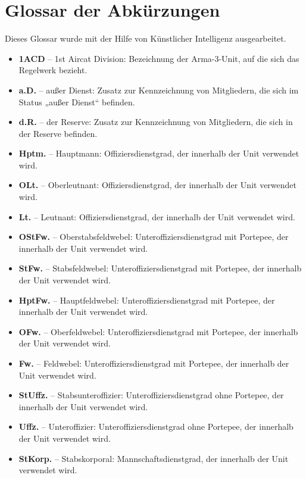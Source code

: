 \newpage
{}
\setcounter{page}{1}
\section{Glossar der Abkürzungen}

Dieses Glossar wurde mit der Hilfe von Künstlicher Intelligenz ausgearbeitet.

\begin{itemize}
    \item \textbf{1ACD} -- 1st Aircat Division: Bezeichnung der Arma-3-Unit, auf die sich das Regelwerk bezieht.
    \item \textbf{a.D.} -- außer Dienst: Zusatz zur Kennzeichnung von Mitgliedern, die sich im Status „außer Dienst“ befinden.
    \item \textbf{d.R.} -- der Reserve: Zusatz zur Kennzeichnung von Mitgliedern, die sich in der Reserve befinden.
    \item \textbf{Hptm.} -- Hauptmann: Offiziersdienstgrad, der innerhalb der Unit verwendet wird.
    \item \textbf{OLt.} -- Oberleutnant: Offiziersdienstgrad, der innerhalb der Unit verwendet wird.
    \item \textbf{Lt.} -- Leutnant: Offiziersdienstgrad, der innerhalb der Unit verwendet wird.
    \item \textbf{OStFw.} -- Oberstabsfeldwebel: Unteroffiziersdienstgrad mit Portepee, der innerhalb der Unit verwendet wird.
    \item \textbf{StFw.} -- Stabsfeldwebel: Unteroffiziersdienstgrad mit Portepee, der innerhalb der Unit verwendet wird.
    \item \textbf{HptFw.} -- Hauptfeldwebel: Unteroffiziersdienstgrad mit Portepee, der innerhalb der Unit verwendet wird.
    \item \textbf{OFw.} -- Oberfeldwebel: Unteroffiziersdienstgrad mit Portepee, der innerhalb der Unit verwendet wird.
    \item \textbf{Fw.} -- Feldwebel: Unteroffiziersdienstgrad mit Portepee, der innerhalb der Unit verwendet wird.
    \item \textbf{StUffz.} -- Stabsunteroffizier: Unteroffiziersdienstgrad ohne Portepee, der innerhalb der Unit verwendet wird.
    \item \textbf{Uffz.} -- Unteroffizier: Unteroffiziersdienstgrad ohne Portepee, der innerhalb der Unit verwendet wird.
    \item \textbf{StKorp.} -- Stabskorporal: Mannschaftsdienstgrad, der innerhalb der Unit verwendet wird.

\end{itemize}
